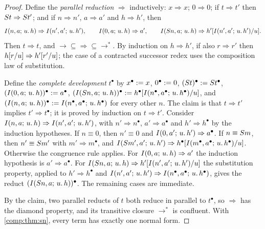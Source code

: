 \begin{proof}
Define the \emph{parallel reduction} $\Rightarrow$ inductively: $x\Rightarrow
x$; $0\Rightarrow0$; if $t\Rightarrow t'$ then $S t\Rightarrow S t'$;
and if $n\Rightarrow n'$, $a\Rightarrow a'$ and $h\Rightarrow h'$, then
\[
 I(n,a;\,u.\,h)\Rightarrow I(n',a';\,u.\,h'),\qquad
 I(0,a;\,u.\,h)\Rightarrow a',\qquad
 I(S n,a;\,u.\,h)\Rightarrow h'[I(n',a';\,u.\,h')/u].
\]
Then $t\Rightarrow t$, and ${\to}\subseteq{\Rightarrow}\subseteq{\to^{*}}$.
By induction on $h\Rightarrow h'$, if also $r\Rightarrow r'$ then
$h[r/u]\Rightarrow h'[r'/u]$; the case of a contracted
successor redex uses the composition law of substitution.

Define the \emph{complete development} $t^{\bullet}$ by
$x^{\bullet}\mathrel{:=} x$, $0^{\bullet}\mathrel{:=}0$,
$(S t)^{\bullet}\mathrel{:=}S t^{\bullet}$,
$(I(0,a;\,u.\,h))^{\bullet}\mathrel{:=} a^{\bullet}$,
$(I(S n,a;\,u.\,h))^{\bullet}\mathrel{:=}
h^{\bullet}[I(n^{\bullet},a^{\bullet};\,u.\,h^{\bullet})/u]$, and
$(I(n,a;\,u.\,h))^{\bullet}\mathrel{:=}
I(n^{\bullet},a^{\bullet};\,u.\,h^{\bullet})$ for every other $n$. The
claim is that $t\Rightarrow t'$ implies $t'\Rightarrow t^{\bullet}$; it is
proved by induction on $t\Rightarrow t'$. Consider
$I(n,a;\,u.\,h)\Rightarrow I(n',a';\,u.\,h')$, with
$n'\Rightarrow n^{\bullet}$, $a'\Rightarrow a^{\bullet}$ and
$h'\Rightarrow h^{\bullet}$ by the induction hypotheses. If $n\equiv0$, then
$n'\equiv0$ and $I(0,a';\,u.\,h')\Rightarrow a^{\bullet}$. If
$n\equiv S m$, then $n'\equiv S m'$ with $m'\Rightarrow m^{\bullet}$, and
$I(S m',a';\,u.\,h')\Rightarrow
h^{\bullet}[I(m^{\bullet},a^{\bullet};\,u.\,h^{\bullet})/u]$.
Otherwise the congruence rule applies. For
$I(0,a;\,u.\,h)\Rightarrow a'$ the induction hypothesis is
$a'\Rightarrow a^{\bullet}$. For
$I(S n,a;\,u.\,h)\Rightarrow h'[I(n',a';\,u.\,h')/u]$ the
substitution property, applied to $h'\Rightarrow h^{\bullet}$ and
$I(n',a';\,u.\,h')\Rightarrow I(n^{\bullet},a^{\bullet};\,u.\,h^{\bullet})$,
gives the reduct $(I(S n,a;\,u.\,h))^{\bullet}$. The remaining cases are
immediate.

By the claim, two parallel reducts of $t$ both reduce in parallel to
$t^{\bullet}$, so $\Rightarrow$ has the diamond property, and its transitive
closure $\to^{*}$ is confluent. With \cref{comp:thm:sn}, every term has
exactly one normal form.
\end{proof}

